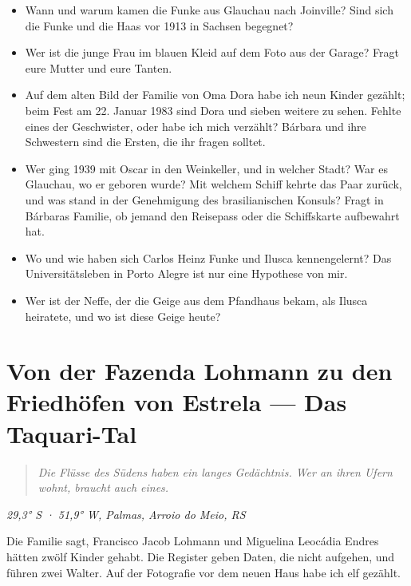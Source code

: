 \documentclass[
  ngerman,
  11pt,
  openany]{book}
\providecommand{\tightlist}{%
  \setlength{\itemsep}{0pt}\setlength{\parskip}{0pt}}
\begin{document}
\begin{itemize}
\tightlist
\item
  Wann und warum kamen die Funke aus Glauchau nach Joinville? Sind sich
  die Funke und die Haas vor 1913 in Sachsen begegnet?
\item
  Wer ist die junge Frau im blauen Kleid auf dem Foto aus der Garage?
  Fragt eure Mutter und eure Tanten.
\item
  Auf dem alten Bild der Familie von Oma Dora habe ich neun Kinder
  gezählt; beim Fest am 22. Januar 1983 sind Dora und sieben weitere zu
  sehen. Fehlte eines der Geschwister, oder habe ich mich verzählt?
  Bárbara und ihre Schwestern sind die Ersten, die ihr fragen solltet.
\item
  Wer ging 1939 mit Oscar in den Weinkeller, und in welcher Stadt? War
  es Glauchau, wo er geboren wurde? Mit welchem Schiff kehrte das Paar
  zurück, und was stand in der Genehmigung des brasilianischen Konsuls?
  Fragt in Bárbaras Familie, ob jemand den Reisepass oder die
  Schiffskarte aufbewahrt hat.
\item
  Wo und wie haben sich Carlos Heinz Funke und Ilusca kennengelernt? Das
  Universitätsleben in Porto Alegre ist nur eine Hypothese von mir.
\item
  Wer ist der Neffe, der die Geige aus dem Pfandhaus bekam, als Ilusca
  heiratete, und wo ist diese Geige heute?
\end{itemize}

\chapter{Von der Fazenda Lohmann zu den Friedhöfen von Estrela --- Das
Taquari-Tal}\label{cap-12}

\begin{quote}
\emph{Die Flüsse des Südens haben ein langes Gedächtnis. Wer an ihren
Ufern wohnt, braucht auch eines.}
\end{quote}

\emph{29,3° S · 51,9° W, Palmas, Arroio do Meio, RS}

Die Familie sagt, Francisco Jacob Lohmann und Miguelina Leocádia Endres
hätten zwölf Kinder gehabt. Die Register geben Daten, die nicht
aufgehen, und führen zwei Walter. Auf der Fotografie vor dem neuen Haus
habe ich elf gezählt.
\end{document}
